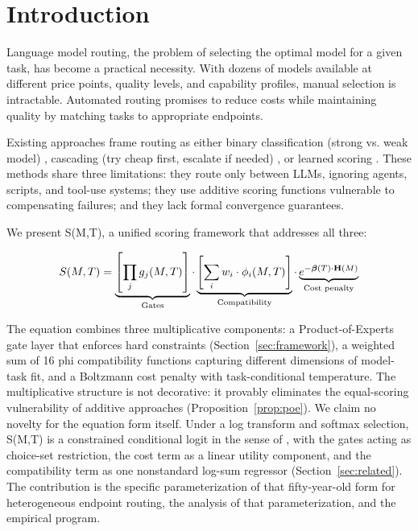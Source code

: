 \section{Introduction}
\label{sec:intro}

Language model routing, the problem of selecting the optimal model for a given task, has become a practical necessity. With dozens of models available at different price points, quality levels, and capability profiles, manual selection is intractable. Automated routing promises to reduce costs while maintaining quality by matching tasks to appropriate endpoints.

Existing approaches frame routing as either binary classification (strong vs. weak model) \citep{ong2024routellm}, cascading (try cheap first, escalate if needed) \citep{chen2023frugalgpt}, or learned scoring \citep{hu2024routerbench}. These methods share three limitations: they route only between LLMs, ignoring agents, scripts, and tool-use systems; they use additive scoring functions vulnerable to compensating failures; and they lack formal convergence guarantees.

We present S(M,T), a unified scoring framework that addresses all three:

\begin{equation*}
S(M,T) = \underbrace{\left[\prod_{j} g_j(M,T)\right]}_{\text{Gates}} \cdot \underbrace{\left[\sum_{i} w_i \cdot \phi_i(M,T)\right]}_{\text{Compatibility}} \cdot \underbrace{e^{-\boldsymbol{\beta}(T) \cdot \mathbf{H}(M)}}_{\text{Cost penalty}}
\end{equation*}

The equation combines three multiplicative components: a Product-of-Experts gate layer that enforces hard constraints (Section~\ref{sec:framework}), a weighted sum of 16 phi compatibility functions capturing different dimensions of model-task fit, and a Boltzmann cost penalty with task-conditional temperature. The multiplicative structure is not decorative: it provably eliminates the equal-scoring vulnerability of additive approaches (Proposition~\ref{prop:poe}). We claim no novelty for the equation form itself. Under a log transform and softmax selection, S(M,T) is a constrained conditional logit in the sense of \citet{mcfadden1974conditional}, with the gates acting as choice-set restriction, the cost term as a linear utility component, and the compatibility term as one nonstandard log-sum regressor (Section~\ref{sec:related}). The contribution is the specific parameterization of that fifty-year-old form for heterogeneous endpoint routing, the analysis of that parameterization, and the empirical program.

